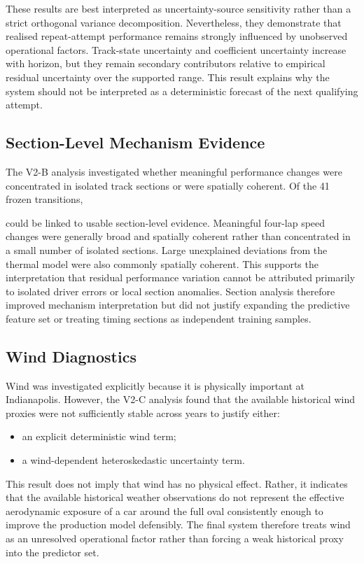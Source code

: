 These results are best interpreted as uncertainty-source sensitivity rather than a strict orthogonal variance decomposition. Nevertheless, they demonstrate that realised repeat-attempt performance remains strongly influenced by unobserved operational factors. Track-state uncertainty and coefficient uncertainty increase with horizon, but they remain secondary contributors relative to empirical residual uncertainty over the supported range. This result explains why the system should not be interpreted as a deterministic forecast of the next qualifying attempt.

\subsection{Section-Level Mechanism Evidence}
The V2-B analysis investigated whether meaningful performance changes were concentrated in isolated track sections or were spatially coherent. Of the 41 frozen transitions,

could be linked to usable section-level evidence. Meaningful four-lap speed changes were generally broad and spatially coherent rather than concentrated in a small number of isolated sections. Large unexplained deviations from the thermal model were also commonly spatially coherent. This supports the interpretation that residual performance variation cannot be attributed primarily to isolated driver errors or local section anomalies. Section analysis therefore improved mechanism interpretation but did not justify expanding the predictive feature set or treating timing sections as independent training samples.

\subsection{Wind Diagnostics}
Wind was investigated explicitly because it is physically important at Indianapolis. However, the V2-C analysis found that the available historical wind proxies were not sufficiently stable across years to justify either:

\begin{itemize}
\item an explicit deterministic wind term;
\item a wind-dependent heteroskedastic uncertainty term.
\end{itemize}

This result does not imply that wind has no physical effect. Rather, it indicates that the available historical weather observations do not represent the effective aerodynamic exposure of a car around the full oval consistently enough to improve the production model defensibly. The final system therefore treats wind as an unresolved operational factor rather than forcing a weak historical proxy into the predictor set.

